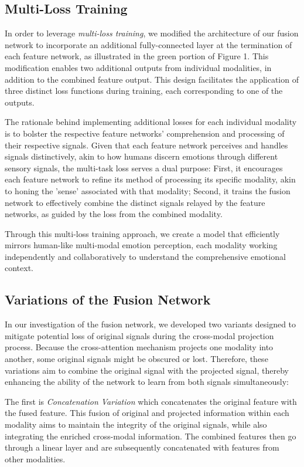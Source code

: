\documentclass[11pt]{article}
\begin{document}
\subsection{Multi-Loss Training}
In order to leverage {\it multi-loss training}, we modified the architecture of our fusion network to incorporate an additional fully-connected layer at the termination of each feature network, as illustrated in the green portion of Figure 1. This modification enables two additional outputs from individual modalities, in addition to the combined feature output. This design facilitates the application of three distinct loss functions during training, each corresponding to one of the outputs. 

The rationale behind implementing additional losses for each individual modality is to bolster the respective feature networks' comprehension and processing of their respective signals.  Given that each feature network perceives and handles signals distinctively, akin to how humans discern emotions through different sensory signals, the multi-task loss serves a dual purpose: First, it encourages each feature network to refine its method of processing its specific modality, akin to honing the 'sense' associated with that modality; Second, it trains the fusion network to effectively combine the distinct signals relayed by the feature networks, as guided by the loss from the combined modality.

Through this multi-loss training approach, we create a model that efficiently mirrors human-like multi-modal emotion perception, each modality working independently and collaboratively to understand the comprehensive emotional context.


\subsection{Variations of the Fusion Network}
In our investigation of the fusion network, we developed two variants designed to mitigate potential loss of original signals during the cross-modal projection process. Because the cross-attention mechanism projects one modality into another, some original signals might be obscured or lost. Therefore, these variations aim to combine the original signal with the projected signal, thereby enhancing the ability of the network to learn from both signals simultaneously:

The first is {\it Concatenation Variation} which concatenates the original feature with the fused feature. This fusion of original and projected information within each modality aims to maintain the integrity of the original signals, while also integrating the enriched cross-modal information. The combined features then go through a linear layer and are subsequently concatenated with features from other modalities.  
\end{document}
